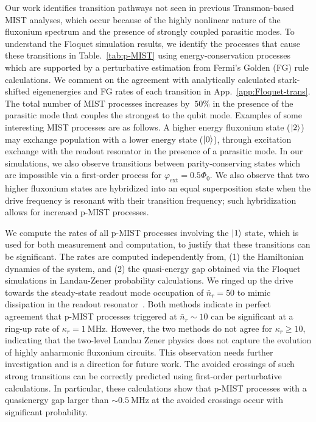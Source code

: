 \documentclass[%
reprint,
superscriptaddress,
 amsmath,amssymb,
 aps,
 prx,
longbibliography,
floatfix,
]{revtex4-2}
\begin{document}
Our work identifies transition pathways not seen in previous Transmon-based MIST analyses, which occur because of the highly nonlinear nature of the fluxonium spectrum and the presence of strongly coupled parasitic modes. To understand the Floquet simulation results, we identify the processes that cause these transitions in Table.~\ref{tab:p-MIST} using energy-conservation processes which are supported by a perturbative estimation from Fermi's Golden (FG) rule calculations. We comment on the agreement with analytically calculated stark-shifted eigenenergies and FG rates of each transition in App.~\ref{app:Floquet-trans}. The total number of MIST processes increases by $~50\%$ in the presence of the parasitic mode that couples the strongest to the qubit mode. Examples of some interesting MIST processes are as follows. A higher energy fluxonium state ($\ket{2}$) may exchange population with a lower energy state ($\ket{0}$), through excitation exchange with the readout resonator in the presence of a parasitic mode. In our simulations, we also observe transitions between parity-conserving states which are impossible via a first-order process for $\varphi_\mathrm{ext}=0.5\Phi_0$. We also observe that two higher fluxonium states are hybridized into an equal superposition state when the drive frequency is resonant with their transition frequency; such hybridization allows for increased p-MIST processes. 

We compute the rates of all p-MIST processes involving the $\ket{1}$ state, which is used for both measurement and computation, to justify that these transitions can be significant. The rates are computed independently from, (1) the Hamiltonian dynamics of the system, and (2) the quasi-energy gap obtained via the Floquet simulations in Landau-Zener probability calculations. We ringed up the drive towards the steady-state readout mode occupation of $\bar n_r=50$ to mimic dissipation in the readout resonator~\cite{dumas2024unified,cohen2023reminiscence}. Both methods indicate in perfect agreement that p-MIST processes triggered at $\bar n_r\sim 10$ can be significant at a ring-up rate of $\kappa_r=1 \ \mathrm{MHz}$. However, the two methods do not agree for $\kappa_r\ge 10$, indicating that the two-level Landau Zener physics does not capture the evolution of highly anharmonic fluxonium circuits. This observation needs further investigation and is a direction for future work.  The avoided crossings of such strong transitions can be correctly predicted using first-order perturbative calculations. In particular, these calculations show that p-MIST processes with a quasienergy gap larger than $\sim 0.5 \ \mathrm{MHz}$ at the avoided crossings occur with significant probability. 
\end{document}
